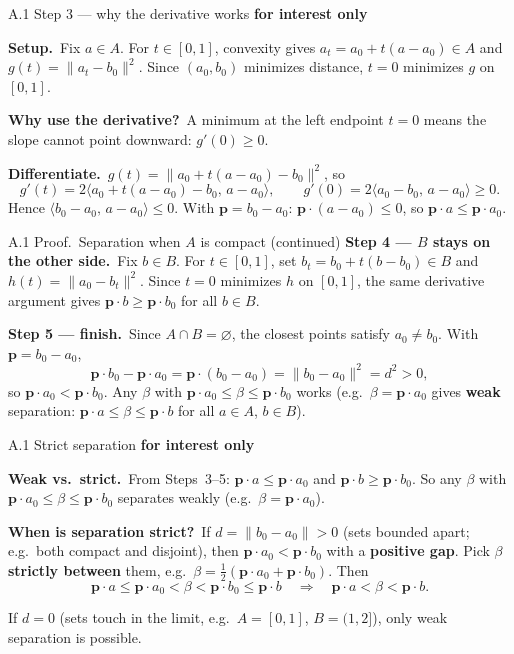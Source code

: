 \documentclass[11pt,aspectratio=169]{beamer}
\newcommand{\InterestOnly}{\textcolor{mAccent}{\textbf{for interest only}}}
\begin{document}
\begin{frame}{A.1 Step 3 --- why the derivative works}
  \footnotesize
  \InterestOnly

  \medskip
  \textbf{Setup.}\
  Fix $a\in A$. For $t\in[0,1]$, convexity gives $a_t=a_0+t(a-a_0)\in A$ and
  $g(t)=\|a_t-b_0\|^2$.
  Since $(a_0,b_0)$ minimizes distance, $t=0$ minimizes $g$ on $[0,1]$.

  \medskip
  \textbf{Why use the derivative?}\
  A minimum at the left endpoint $t=0$ means the slope cannot point downward:
  $g'(0)\ge 0$.

  \medskip
  \textbf{Differentiate.}\
  $g(t)=\|a_0+t(a-a_0)-b_0\|^2$, so
  \[
    g'(t)=2\langle a_0+t(a-a_0)-b_0,\,a-a_0\rangle,
    \qquad
    g'(0)=2\langle a_0-b_0,\,a-a_0\rangle\ge 0.
  \]
  Hence $\langle b_0-a_0,\,a-a_0\rangle\le 0$.
  With $\mathbf{p}=b_0-a_0$: $\mathbf{p}\cdot(a-a_0)\le 0$, so $\mathbf{p}\cdot a\le\mathbf{p}\cdot a_0$.
\end{frame}

\begin{frame}{A.1 Proof.\ Separation when $A$ is compact (continued)}
  \footnotesize
  \textbf{Step 4 --- $B$ stays on the other side.}\
  Fix $b\in B$. For $t\in[0,1]$, set $b_t=b_0+t(b-b_0)\in B$ and
  $h(t)=\|a_0-b_t\|^2$.
  Since $t=0$ minimizes $h$ on $[0,1]$, the same derivative argument gives
  $\mathbf{p}\cdot b\ge\mathbf{p}\cdot b_0$ for all $b\in B$.

  \medskip
  \textbf{Step 5 --- finish.}\
  Since $A\cap B=\varnothing$, the closest points satisfy $a_0\neq b_0$.
  With $\mathbf{p}=b_0-a_0$,
  \[
    \mathbf{p}\cdot b_0-\mathbf{p}\cdot a_0
    =\mathbf{p}\cdot(b_0-a_0)
    =\|b_0-a_0\|^2=d^2>0,
  \]
  so $\mathbf{p}\cdot a_0<\mathbf{p}\cdot b_0$.
  Any $\beta$ with $\mathbf{p}\cdot a_0\le\beta\le\mathbf{p}\cdot b_0$ works
  (e.g.\ $\beta=\mathbf{p}\cdot a_0$ gives \textbf{weak} separation:
  $\mathbf{p}\cdot a\le\beta\le\mathbf{p}\cdot b$ for all $a\in A$, $b\in B$).
\end{frame}

\begin{frame}{A.1 Strict separation}
  \hypertarget{sec:separation-strict}{}
  \footnotesize
  \InterestOnly

  \medskip
  \textbf{Weak vs.\ strict.}\
  From Steps~3--5: $\mathbf{p}\cdot a\le\mathbf{p}\cdot a_0$ and $\mathbf{p}\cdot b\ge\mathbf{p}\cdot b_0$.
  So any $\beta$ with $\mathbf{p}\cdot a_0\le\beta\le\mathbf{p}\cdot b_0$ separates weakly
  (e.g.\ $\beta=\mathbf{p}\cdot a_0$).

  \medskip
  \textbf{When is separation strict?}\
  If $d=\|b_0-a_0\|>0$ (sets bounded apart; e.g.\ both compact and disjoint), then
  $\mathbf{p}\cdot a_0<\mathbf{p}\cdot b_0$ with a \textbf{positive gap}.
  Pick $\beta$ \textbf{strictly between} them, e.g.\
  $\beta=\tfrac12(\mathbf{p}\cdot a_0+\mathbf{p}\cdot b_0)$. Then
  \[
    \mathbf{p}\cdot a\le\mathbf{p}\cdot a_0<\beta<\mathbf{p}\cdot b_0\le\mathbf{p}\cdot b
    \quad\Rightarrow\quad
    \mathbf{p}\cdot a<\beta<\mathbf{p}\cdot b.
  \]

  \medskip
  {\scriptsize If $d=0$ (sets touch in the limit, e.g.\ $A=[0,1]$, $B=(1,2]$), only weak separation is possible.}
\end{frame}
\end{document}
